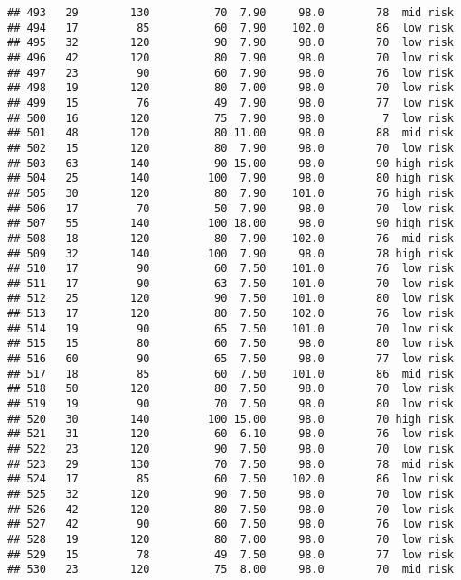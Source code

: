\documentclass[
  ignorenonframetext,
]{beamer}
\begin{document}
\begin{frame}[fragile]
\begin{verbatim}
## 493   29        130          70  7.90     98.0        78  mid risk
## 494   17         85          60  7.90    102.0        86  low risk
## 495   32        120          90  7.90     98.0        70  low risk
## 496   42        120          80  7.90     98.0        70  low risk
## 497   23         90          60  7.90     98.0        76  low risk
## 498   19        120          80  7.00     98.0        70  low risk
## 499   15         76          49  7.90     98.0        77  low risk
## 500   16        120          75  7.90     98.0         7  low risk
## 501   48        120          80 11.00     98.0        88  mid risk
## 502   15        120          80  7.90     98.0        70  low risk
## 503   63        140          90 15.00     98.0        90 high risk
## 504   25        140         100  7.90     98.0        80 high risk
## 505   30        120          80  7.90    101.0        76 high risk
## 506   17         70          50  7.90     98.0        70  low risk
## 507   55        140         100 18.00     98.0        90 high risk
## 508   18        120          80  7.90    102.0        76  mid risk
## 509   32        140         100  7.90     98.0        78 high risk
## 510   17         90          60  7.50    101.0        76  low risk
## 511   17         90          63  7.50    101.0        70  low risk
## 512   25        120          90  7.50    101.0        80  low risk
## 513   17        120          80  7.50    102.0        76  low risk
## 514   19         90          65  7.50    101.0        70  low risk
## 515   15         80          60  7.50     98.0        80  low risk
## 516   60         90          65  7.50     98.0        77  low risk
## 517   18         85          60  7.50    101.0        86  mid risk
## 518   50        120          80  7.50     98.0        70  low risk
## 519   19         90          70  7.50     98.0        80  low risk
## 520   30        140         100 15.00     98.0        70 high risk
## 521   31        120          60  6.10     98.0        76  low risk
## 522   23        120          90  7.50     98.0        70  low risk
## 523   29        130          70  7.50     98.0        78  mid risk
## 524   17         85          60  7.50    102.0        86  low risk
## 525   32        120          90  7.50     98.0        70  low risk
## 526   42        120          80  7.50     98.0        70  low risk
## 527   42         90          60  7.50     98.0        76  low risk
## 528   19        120          80  7.00     98.0        70  low risk
## 529   15         78          49  7.50     98.0        77  low risk
## 530   23        120          75  8.00     98.0        70  mid risk

\end{verbatim}
\end{frame}
\end{document}
